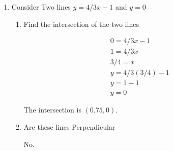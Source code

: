 \documentclass{article}
\begin{document}
\begin{enumerate}
\begin{enumerate}
\begin{gather}
                        \begin{bmatrix}
                            2 & 0 & 3\\ 
                            0 & -1 & 2\\
                            3 & 2 & -2
                        \end{bmatrix} \cdot
                        \begin{bmatrix}
                            -1 & -4 & 1\\ 
                            1 & -1 & 4\\
                            0 & 0 & 5
                        \end{bmatrix}\\
                        =
                        \begin{bmatrix}
                            -2 & -8 & 17\\ 
                            -1 & 1 & 6\\
                            -1 & -14 & 1
                        \end{bmatrix}
                    \end{gather}
            \end{enumerate}
        \item Consider Two lines $y = 4/3 x - 1$ and
            $y = 0$
            \begin{enumerate}
                \item Find the intersection of the two lines

                    \begin{mdframed}
                        \begin{gather}
                            0 = 4/3 x - 1\\
                            1 = 4/3 x\\
                            3/4 = x\\
                            y = 4/3(3/4) - 1\\
                            y = 1 - 1\\
                            y = 0
                        \end{gather}

                        The intersection is $(0.75, 0)$.
                    \end{mdframed}
                \item Are these lines Perpendicular
                    \begin{mdframed}
                        No.


\end{mdframed}
\end{enumerate}
\end{enumerate}
\end{document}
